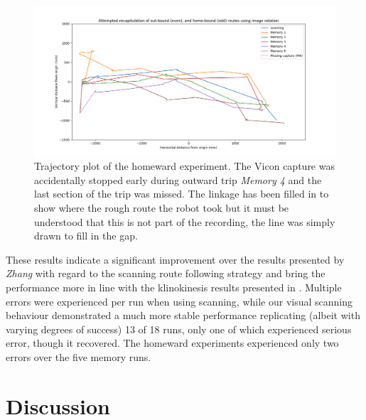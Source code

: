 \documentclass[a4paper,11pt,twoside,openright]{article}
\let\oldsection\section
\def\section{\cleardoublepage\oldsection}
\begin{document}
\begin{figure}
 \centering
  \includegraphics[width=\textwidth]{Homeward}
  \caption{
    \label{fig:home} Trajectory plot of the homeward experiment. The Vicon capture was accidentally stopped
    early during outward trip \textit{Memory 4} and the last section of the trip was missed. The linkage has
    been filled in to show where the rough route the robot took but it must be understood that this is not
    part of the recording, the line was simply drawn to fill in the gap. 
  }
\end{figure}

These results indicate a significant improvement over the results presented by \textit{Zhang} with regard to the
scanning route following strategy and bring the performance more in line with the klinokinesis results presented in
\cite{Zhang2017}. Multiple errors were experienced per run when using scanning, while our visual scanning behaviour
demonstrated a much more stable performance replicating (albeit with varying degrees of success) 13 of 18 runs, only one of
which experienced serious error, though it recovered. The homeward experiments experienced only two errors over the five memory runs.
\newpage

\section{ Discussion } \label{sec:discussion}
\end{document}
